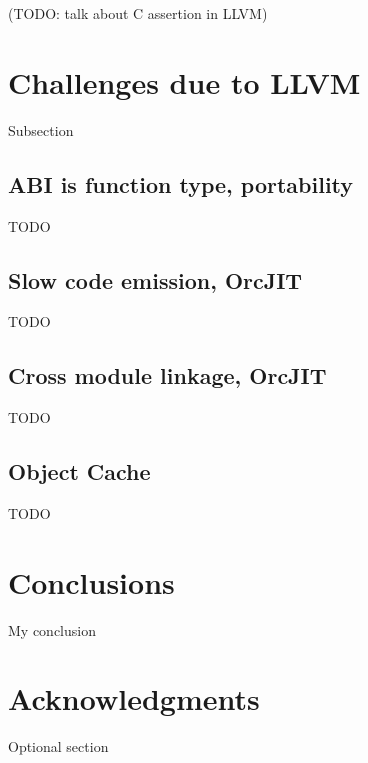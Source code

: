 \documentclass{acm_proc_article-sp}
\begin{document}
(TODO: talk about C assertion in LLVM)


\section{Challenges due to LLVM}
Subsection

\subsection{ABI is function type, portability}

TODO

\subsection{Slow code emission, OrcJIT}

TODO

\subsection{Cross module linkage, OrcJIT}

TODO

\subsection{Object Cache}

TODO

\section{Conclusions}
My conclusion

\section{Acknowledgments}
Optional section

%

%
%


\end{document}
